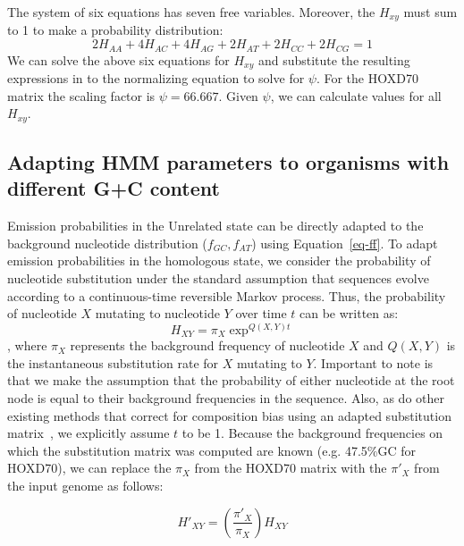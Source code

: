 The system of six equations has seven free variables.  Moreover, the $H_{xy}$ must sum to 1 to make a probability distribution:
\begin{equation}
2H_{AA} + 4H_{AC} + 4H_{AG} + 2H_{AT} + 2H_{CC} + 2H_{CG} = 1
\end{equation}
We can solve the above six equations for $H_{xy}$ and substitute the
resulting expressions in to the normalizing equation to solve for
$\psi$. For the HOXD70 matrix the scaling factor is $\psi=66.667$. Given
$\psi$, we can calculate values for all $H_{xy}$.

\subsection*{Adapting HMM parameters to organisms with different G+C content}

Emission
probabilities in the Unrelated state can be directly adapted to the
background nucleotide distribution ($f_{GC}, f_{AT}$) using Equation~\ref{eq-ff}. To adapt emission probabilities in the homologous state, we consider the
probability of nucleotide substitution under the standard assumption
that sequences evolve according to a continuous-time reversible Markov process.
Thus, the probability of nucleotide $X$ mutating to nucleotide $Y$ over time $t$
can be written as: 
\begin{equation}
H_{XY}=\pi_X \exp^{Q(X,Y)t}
\end{equation}
, where $\pi_X$ represents the background
frequency of nucleotide $X$ and $Q(X,Y)$ is the instantaneous substitution rate for $X$
mutating to $Y$. Important to note is that we make the assumption that the probability of
either nucleotide at the root node is equal to their background
frequencies in the sequence. Also, as do other existing methods that correct for composition bias using an adapted substitution matrix~\cite{repseek}, we explicitly assume $t$ to be 1.  Because the background frequencies on which the substitution matrix was computed are
known (e.g. 47.5\%GC for HOXD70), we can replace the $\pi_X$ from the HOXD70 matrix
with the $\pi'_X$ from the input genome as follows:

\begin{equation}
H'_{XY}=(\frac{\pi'_X}{\pi_X})  H_{XY}
\end{equation}

